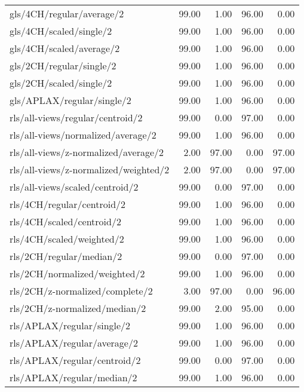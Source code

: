 \begin{longtable}{lrrrr}
    gls/4CH/regular/average/2                 & 99.00 &  1.00 & 96.00 &  0.00 \\
    gls/4CH/scaled/single/2                   & 99.00 &  1.00 & 96.00 &  0.00 \\
    gls/4CH/scaled/average/2                  & 99.00 &  1.00 & 96.00 &  0.00 \\
    gls/2CH/regular/single/2                  & 99.00 &  1.00 & 96.00 &  0.00 \\
    gls/2CH/scaled/single/2                   & 99.00 &  1.00 & 96.00 &  0.00 \\
    gls/APLAX/regular/single/2                & 99.00 &  1.00 & 96.00 &  0.00 \\
    rls/all-views/regular/centroid/2          & 99.00 &  0.00 & 97.00 &  0.00 \\
    rls/all-views/normalized/average/2        & 99.00 &  1.00 & 96.00 &  0.00 \\
    rls/all-views/z-normalized/average/2      &  2.00 & 97.00 &  0.00 & 97.00 \\
    rls/all-views/z-normalized/weighted/2     &  2.00 & 97.00 &  0.00 & 97.00 \\
    rls/all-views/scaled/centroid/2           & 99.00 &  0.00 & 97.00 &  0.00 \\
    rls/4CH/regular/centroid/2                & 99.00 &  1.00 & 96.00 &  0.00 \\
    rls/4CH/scaled/centroid/2                 & 99.00 &  1.00 & 96.00 &  0.00 \\
    rls/4CH/scaled/weighted/2                 & 99.00 &  1.00 & 96.00 &  0.00 \\
    rls/2CH/regular/median/2                  & 99.00 &  0.00 & 97.00 &  0.00 \\
    rls/2CH/normalized/weighted/2             & 99.00 &  1.00 & 96.00 &  0.00 \\
    rls/2CH/z-normalized/complete/2           &  3.00 & 97.00 &  0.00 & 96.00 \\
    rls/2CH/z-normalized/median/2             & 99.00 &  2.00 & 95.00 &  0.00 \\
    rls/APLAX/regular/single/2                & 99.00 &  1.00 & 96.00 &  0.00 \\
    rls/APLAX/regular/average/2               & 99.00 &  1.00 & 96.00 &  0.00 \\
    rls/APLAX/regular/centroid/2              & 99.00 &  0.00 & 97.00 &  0.00 \\
    rls/APLAX/regular/median/2                & 99.00 &  1.00 & 96.00 &  0.00 \\

\end{longtable}
